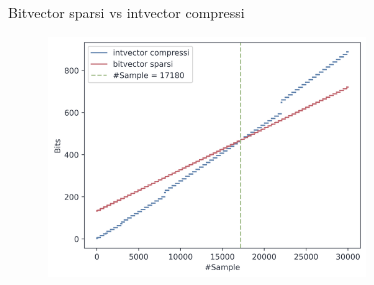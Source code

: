 \documentclass[]{beamer}
\begin{document}
\begin{frame}{Bitvector sparsi vs intvector compressi}
  \begin{figure}[H]
    \centering
    \includegraphics[width=0.75\textwidth]{img/bv_vs_iv.png}
  \end{figure}
\end{frame}
\end{document}
